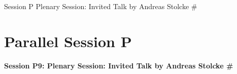 \clearpage
{}
\begin{ThreeSessionOverview}{Session P}{\daydateyear}
  {Plenary Session: Invited Talk by Andreas Stolcke #}
\end{ThreeSessionOverview}

\newpage
\section*{Parallel Session P}
{\bfseries\large Session P9: Plenary Session: Invited Talk by Andreas Stolcke #}\\
\TrackALoc\hfill\sessionchair{}{}
\clearpage


